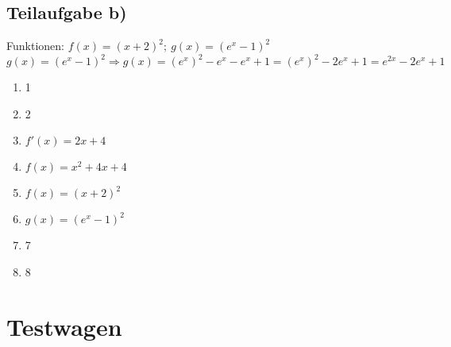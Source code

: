 \documentclass[11pt, a4paper]{report}
\begin{document}
	\section{Teilaufgabe b)}
	Funktionen: $f(x) = (x + 2)^2;\ g(x) = (e^x - 1)^2$ \\
	$g(x) = (e^x - 1)^2 \Rightarrow g(x) = (e^x)^2  - e^x - e^x + 1 = (e^x)^2 - 2e^x + 1 = e^{2x} - 2e^x + 1$
	\begin{enumerate}
		\item 1
		\item 2
		\item $f'(x) = 2x + 4$
		\item $f(x) = x^2 + 4x + 4$
		\item $f(x) = (x + 2)^2$
		\item $g(x) = (e^x - 1)^2$
		\item 7
		\item 8
	\end{enumerate}
	\chapter{Testwagen}
\end{document}
